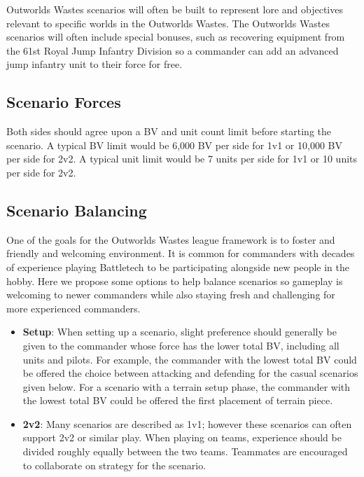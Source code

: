 \documentclass[UTF8]{article}
\begin{document}
Outworlds Wastes scenarios will often be built to represent lore and objectives relevant to specific worlds in the Outworlds Wastes.
The Outworlds Wastes scenarios will often include special bonuses, such as recovering equipment from the 61st Royal Jump Infantry Division so a commander can add an advanced jump infantry unit to their force for free.\\

\subsection{Scenario Forces}

Both sides should agree upon a BV and unit count limit before starting the scenario.
A typical BV limit would be 6,000 BV per side for 1v1 or 10,000 BV per side for 2v2.
A typical unit limit would be 7 units per side for 1v1 or 10 units per side for 2v2.\\

\subsection{Scenario Balancing}

One of the goals for the Outworlds Wastes league framework is to foster and friendly and welcoming environment.
It is common for commanders with decades of experience playing Battletech to be participating alongside new people in the hobby.
Here we propose some options to help balance scenarios so gameplay is welcoming to newer commanders while also staying fresh and challenging for more experienced commanders.\\

\begin{itemize}

\item {\bf Setup}: When setting up a scenario, slight preference should generally be given to the commander whose force has the lower total BV, including all units and pilots.
For example, the commander with the lowest total BV could be offered the choice between attacking and defending for the casual scenarios given below.
For a scenario with a terrain setup phase, the commander with the lowest total BV could be offered the first placement of terrain piece.

\item {\bf 2v2}: Many scenarios are described as 1v1; however these scenarios can often support 2v2 or similar play.
When playing on teams, experience should be divided roughly equally between the two teams.
Teammates are encouraged to collaborate on strategy for the scenario.

\end{itemize}
\end{document}
